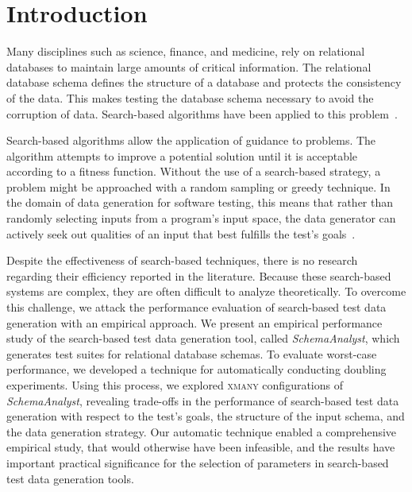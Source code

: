 
\vspace*{-.25in}
\section{Introduction}


Many disciplines such as science, finance, and medicine, rely on relational databases to maintain large amounts of
critical information. The relational database schema defines the structure of a database and protects the consistency of
the data. This makes testing the database schema necessary to avoid the corruption of data. Search-based algorithms have
been applied to this problem~\cite{Kapfhammer2013}.


Search-based algorithms allow the application of guidance to problems. The algorithm attempts to improve a potential
solution until it is acceptable according to a fitness function. Without the use of a search-based strategy, a problem
might be approached with a random sampling or greedy technique. In the domain of data generation for software testing,
this means that rather than randomly selecting inputs from a program’s input space, the data generator can actively seek
out qualities of an input that best fulfills the test’s goals~\cite{McMinn2004a}.

Despite the effectiveness of search-based techniques, there is no research regarding their efficiency reported in the
literature. Because these search-based systems are complex, they are often difficult to analyze theoretically. To
overcome this challenge, we attack the performance evaluation of search-based test data generation with an empirical
approach. We present an empirical performance study of the search-based test data generation tool, called
\textit{SchemaAnalyst}, which generates test suites for relational database schemas. To evaluate worst-case performance,
we developed a technique for automatically conducting doubling experiments. Using this process, we explored
\textsc{xmany} configurations of \textit{SchemaAnalyst}, revealing trade-offs in the performance of search-based test
data generation with respect to the test’s goals, the structure of the input schema, and the data generation strategy.
Our automatic technique enabled a comprehensive empirical study, that would otherwise have been infeasible, and the
results have important practical significance for the selection of parameters in search-based test data generation
tools.

